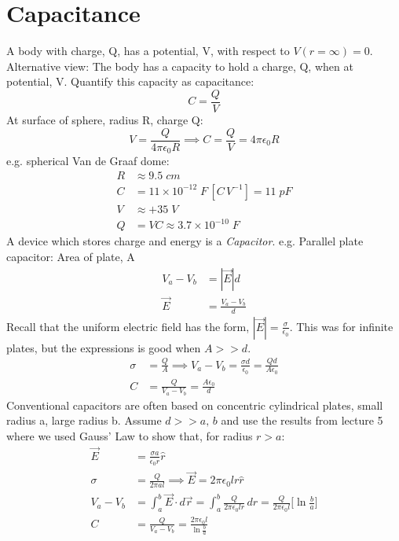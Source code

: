 \documentclass[a4paper, 11pt, normalem]{report}
\begin{document}
\section{Capacitance}
A body with charge, Q, has a potential, V, with respect to $V(r = \infty) = 0$. 
Alternative view: The body has a capacity to hold a charge, Q, when at potential, V. Quantify this capacity as capacitance:
\begin{equation}
    C = \frac{Q}{V}
\end{equation}
At surface of sphere, radius R, charge Q:
\begin{equation}
    V = \frac{Q}{4\pi\epsilon_{0} R} \implies C = \frac{Q}{V} = 4\pi\epsilon_{0}R
\end{equation}
e.g. spherical Van de Graaf dome:
\begin{align}
    R &\approx 9.5 \; cm \\
    C &= 11 \times 10^{-12} \; F\,[C\,V^{-1}] = 11 \; pF \\
    V &\approx + 35\;V \\
    Q &= VC \approx 3.7 \times 10^{-10} \; F
\end{align}
A device which stores charge and energy is a \emph{Capacitor}.
e.g. Parallel plate capacitor: 
Area of plate, A
\begin{align}
    V_{a} - V_{b} &= |\vec{E}|d \\
    \vec{E} &= \frac{V_{a} - V_{b}}{d}
\end{align}
Recall that the uniform electric field has the form, $|\vec{E}| = \frac{\sigma}{\epsilon_{0}}$. 
This was for infinite plates, but the expressions is good when $A >> d$.
\begin{align}
    \sigma &= \frac{Q}{A} \implies V_{a} - V_{b} = \frac{\sigma d}{\epsilon_{0}} = \frac{Q d}{A \epsilon_{0}} \\
    C &= \frac{Q}{V_{a} - V_{b}} = \frac{A \epsilon_{0}}{d}
\end{align}
Conventional capacitors are often based on concentric cylindrical plates, small radius a, large radius b.
Assume $d >> a,\,b$ and use the results from lecture 5 where we used Gauss' Law to show that, for radius $r > a$:
\begin{align}
    \vec{E} &= \frac{\sigma a}{\epsilon_{0} r} \hat{r} \\
    \sigma &= \frac{Q}{2\pi a l} \implies \vec{E} = 2\pi \epsilon_{0} l r \hat{r} \\
    V_{a} - V_{b} &= \int_{a}^{b} \vec{E} \cdot d\vec{r} = \int_{a}^{b} \frac{Q}{2\pi\epsilon_{0}lr}\,dr = \frac{Q}{2\pi\epsilon_{0}l}\Big[\ln\frac{b}{a}\Big] \\
    C &= \frac{Q}{V_{a} - V_{b}} = \frac{2\pi\epsilon_{0}l}{\ln\tfrac{b}{a}}
\end{align}
\end{document}
